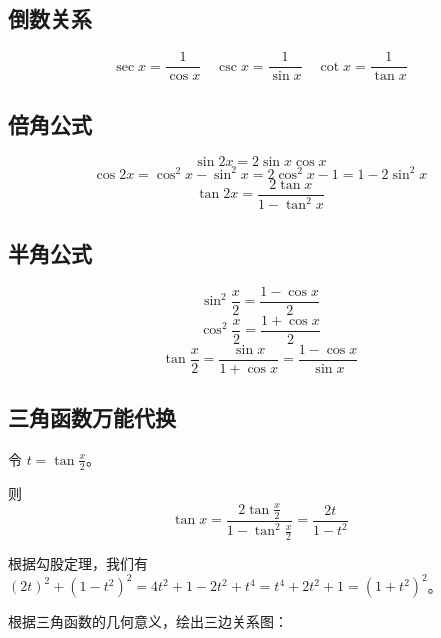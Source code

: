 \subsection*{倒数关系}
\[
\sec x = \frac{1}{\cos x} \quad \csc x = \frac{1}{\sin x} \quad \cot x = \frac{1}{\tan x}
\]

\subsection*{倍角公式}
\[
\sin 2x = 2 \sin x \cos x
\]
\[
\cos 2x = \cos^2 x - \sin^2 x = 2\cos^2 x - 1 = 1 - 2\sin^2 x
\]
\[
\tan 2x = \frac{2\tan x}{1 - \tan^2 x}
\]

\subsection*{半角公式}
\[
\sin^2 \frac{x}{2} = \frac{1 - \cos x}{2}
\]
\[
\cos^2 \frac{x}{2} = \frac{1 + \cos x}{2}
\]
\[
\tan \frac{x}{2} = \frac{\sin x}{1 + \cos x} = \frac{1 - \cos x}{\sin x}
\]

\subsection*{三角函数万能代换}

令 $t = \tan \frac{x}{2}$。

则
$$ \tan x = \frac{2 \tan \frac{x}{2}}{1 - \tan^2 \frac{x}{2}} = \frac{2t}{1 - t^2} $$

根据勾股定理，我们有 $(2t)^2 + (1 - t^2)^2 = 4t^2 + 1 - 2t^2 + t^4 = t^4 + 2t^2 + 1 = (1 + t^2)^2$。

根据三角函数的几何意义，绘出三边关系图：

